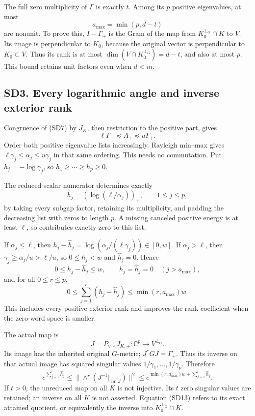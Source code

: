 \documentclass[11pt]{article}
\begin{document}
The full zero multiplicity of \(\Gamma\) is exactly \(t\). Among its \(p\) positive eigenvalues, at most \[
a_{\max}=\min(p,d-t)
\tag{SD8}
\] are nonunit. To prove this, \(I-\Gamma_+\) is the Gram of the map from \(K_0^{\perp_G}\cap K\) to \(V\). Its image is perpendicular to \(K_0\), because the original vector is perpendicular to \(K_0\subset V\). Thus its rank is at most \(\dim(V\cap K_0^{\perp_G})=d-t\), and also at most \(p\). This bound retains unit factors even when \(d<m\).

\subsection{SD3. Every logarithmic angle and inverse exterior rank}\label{sd3.-every-logarithmic-angle-and-inverse-exterior-rank}

Congruence of (SD7) by \(J_K\), then restriction to the positive part, gives \[
\ell\Gamma_+\preceq A_+\preceq u\Gamma_+.
\tag{SD9}
\] Order both positive eigenvalue lists increasingly. Rayleigh min--max gives \(\ell\gamma_j\le\alpha_j\le u\gamma_j\) in that same ordering. This needs no commutation. Put \(h_j=-\log\gamma_j\), so \(h_1\ge\cdots\ge h_p\ge0\).

The reduced scalar numerator determines exactly \[
\widehat h_j=(\log(\ell/\alpha_j))_+,\qquad1\le j\le p,
\tag{SD10}
\] by taking every subgap factor, retaining its multiplicity, and padding the decreasing list with zeros to length \(p\). A missing canceled positive energy is at least \(\ell\), so contributes exactly zero to this list.

If \(\alpha_j\le\ell\), then \(h_j-\widehat h_j=\log(\alpha_j/(\ell\gamma_j))\in[0,w]\). If \(\alpha_j>\ell\), then \(\gamma_j\ge\alpha_j/u>\ell/u\), so \(0\le h_j<w\) and \(\widehat h_j=0\). Hence \[
0\le h_j-\widehat h_j\le w,\qquad
h_j=\widehat h_j=0\quad(j>a_{\max}),
\tag{SD11}
\] and for all \(0\le r\le p\), \[
0\le\sum_{j=1}^r(h_j-\widehat h_j)\le\min(r,a_{\max})w.
\tag{SD12}
\] This includes every positive exterior rank and improves the rank coefficient when the zero-word space is smaller.

The actual map is \[
J=P_{V^{\perp_G}}J_{K,+}:\mathbb C^p\longrightarrow V^{\perp_G}.
\] Its image has the inherited original \(G\)-metric; \(J^*GJ=\Gamma_+\). Thus its inverse on that actual image has squared singular values \(1/\gamma_1,\ldots,1/\gamma_p\). Therefore \[
e^{\sum_{j=1}^r\widehat h_j}
\le\|\wedge^r(J^{-1}|_{\operatorname{im}J})\|^2
\le e^{\min(r,a_{\max})w+\sum_{j=1}^r\widehat h_j}.
\tag{SD13}
\] If \(t>0\), the unreduced map on all \(K\) is not injective. Its \(t\) zero singular values are retained; an inverse on all \(K\) is not asserted. Equation (SD13) refers to its exact attained quotient, or equivalently the inverse into \(K_0^{\perp_G}\cap K\).
\end{document}

